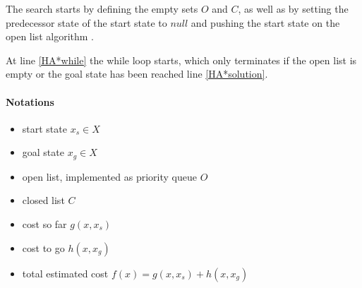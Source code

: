 The search starts by defining the empty sets $O$ and $C$, as well as by setting the predecessor state of the start state to $null$ and pushing the start state on the open list algorithm .

At line \ref{HA*while} the while loop starts, which only terminates if the open list is empty or the goal state has been reached line \ref{HA*solution}.

\paragraph{Notations}
\begin{itemize}
    \item start state $x_s \in X$
    \item goal state $x_g \in X$
    \item open list, implemented as priority queue $O$
    \item closed list $C$
    \item cost so far $g(x,x_s)$
    \item cost to go $h(x,x_g)$
    \item total estimated cost $f(x) = g(x,x_s) + h(x,x_g)$
\end{itemize}

